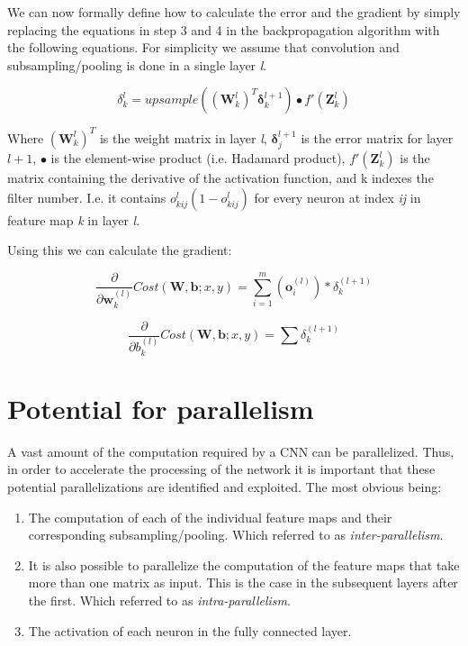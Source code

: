 We can now formally define how to calculate the error and the gradient by simply replacing the equations in step 3 and 4 in the backpropagation algorithm with the following equations. For simplicity we assume that convolution and subsampling/pooling is done in a single layer \textit{l}.




\begin{equation}
	\delta_{k}^{l} =  upsample( (\mathbf{W}_{k}^l)^T \mathbf{\delta}_{k}^{l+1})\bullet f'(\mathbf{Z}_k^l)
\end{equation}

Where $  (\mathbf{W}_{k}^l)^T $ is the weight matrix in layer \textit{l}, $  \mathbf{\delta}_{j}^{l+1} $ is the error matrix for layer $ l + 1 $, $ \bullet $ is the element-wise product (i.e. Hadamard product), $ f'(\mathbf{Z}_k^l) $ is the matrix containing the derivative of the activation function, and k indexes the filter number. I.e. it contains $ o_{kij}^l(1-o_{kij}^l) $ for every neuron at index \textit{ij} in feature map \textit{k} in layer \textit{l}. 

Using this we can calculate the gradient:

\begin{equation}
	\frac{\partial}{\partial \mathbf{w}_k^{(l)} }Cost(\mathbf{W,b}; x, y) = \sum_{i=1}^{m}(\mathbf{o}_i^{(l)})*\delta_k^{(l+1)}
\end{equation}

\begin{equation}
	\frac{\partial}{\partial b_k^{(l)} }Cost(\mathbf{W,b}; x, y) = \sum\delta_k^{(l+1)}
\end{equation}

\section{Potential for parallelism} \label{sec_pot_parallelism} 

A vast amount of the computation required by a CNN can be parallelized. Thus, in order to accelerate the processing of the network it is important that these potential parallelizations are identified and exploited. The most obvious being:

\begin{enumerate}
	\item The computation of each of the individual feature maps and their corresponding subsampling/pooling. Which \cite{Chakradhar2010} referred to as \textit{inter-parallelism}.
	\item It is also possible to parallelize the computation of the feature maps that take more than one matrix as input. This is the case in the subsequent layers after the first. Which \cite{Chakradhar2010} referred to as \textit{intra-parallelism}.
	\item The activation of each neuron in the fully connected layer. 	
\end{enumerate}

